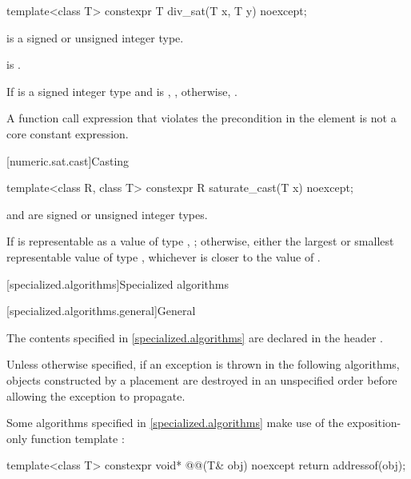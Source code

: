 %
\begin{itemdecl}
template<class T>
  constexpr T div_sat(T x, T y) noexcept;
\end{itemdecl}

\begin{itemdescr}
\pnum
\constraints
{} is a signed or unsigned integer type.

\pnum
\expects
{} is .

\pnum
\returns
If  is a signed integer type
and  is ,
, otherwise, .

\pnum
\remarks
A function call expression
that violates the precondition in the  element
is not a core constant expression.
\end{itemdescr}

[numeric.sat.cast]{Casting}

%
\begin{itemdecl}
template<class R, class T>
  constexpr R saturate_cast(T x) noexcept;
\end{itemdecl}

\begin{itemdescr}
\pnum
\constraints
{} and  are signed or unsigned integer types.

\pnum
\returns
If  is representable as a value of type , ;
otherwise, either the largest or smallest representable value of type ,
whichever is closer to the value of .
\end{itemdescr}

[specialized.algorithms]{Specialized  algorithms}

[specialized.algorithms.general]{General}

\pnum
The contents specified in \ref{specialized.algorithms}
are declared in the header .

\pnum
Unless otherwise specified,
if an exception is thrown in the following algorithms,
objects constructed by a placement 
are destroyed in an unspecified order
before allowing the exception to propagate.

\pnum
Some algorithms specified in \ref{specialized.algorithms}
make use of the exposition-only function template
:
\begin{codeblock}
template<class T>
  constexpr void* @@(T& obj) noexcept {
    return addressof(obj);
  }
\end{codeblock}

